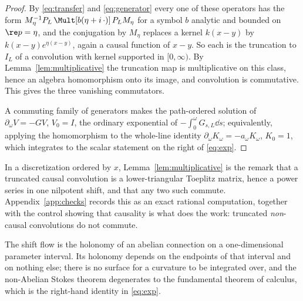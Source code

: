 \begin{proof}
By \eqref{eq:transfer} and \eqref{eq:generator} every one of these operators has
the form $M_\eta^{-1}P_L\,\Mult[b(\eta+i\,\cdot)]\,P_LM_\eta$ for a symbol $b$
analytic and bounded on $\re p=\eta$, and the conjugation by $M_\eta$ replaces a
kernel $k(x-y)$ by $k(x-y)e^{\eta(x-y)}$, again a causal function of $x-y$. So
each is the truncation to $I_L$ of a convolution with kernel supported in
$[0,\infty)$. By Lemma~\ref{lem:multiplicative} the truncation map is
multiplicative on this class, hence an algebra homomorphism onto its image, and
convolution is commutative. This gives the three vanishing commutators.

A commuting family of generators makes the path-ordered solution of
$\partial_\omega V=-GV$, $V_0=I$, the ordinary exponential of
$-\int_0^\omega G_{s,L}\dd s$; equivalently, applying the homomorphism to the
whole-line identity $\partial_\omega K_\omega=-a_\omega K_\omega$, $K_0=1$, which
integrates to the scalar statement on the right of \eqref{eq:exp}.
\end{proof}

\begin{remark}\label{rem:toeplitz}
In a discretization ordered by $x$, Lemma~\ref{lem:multiplicative} is the remark
that a truncated causal convolution is a lower-triangular Toeplitz matrix, hence
a power series in one nilpotent shift, and that any two such commute.
Appendix~\ref{app:checks} records this as an exact rational computation, together
with the control showing that causality is what does the work: truncated
\emph{non}-causal convolutions do not commute.
\end{remark}

\begin{corollary}\label{cor:stokes}
The shift flow is the holonomy of an abelian connection on a one-dimensional
parameter interval. Its holonomy depends on the endpoints of that interval and on
nothing else; there is no surface for a curvature to be integrated over, and the
non-Abelian Stokes theorem degenerates to the fundamental theorem of calculus,
which is the right-hand identity in \eqref{eq:exp}.
\end{corollary}

